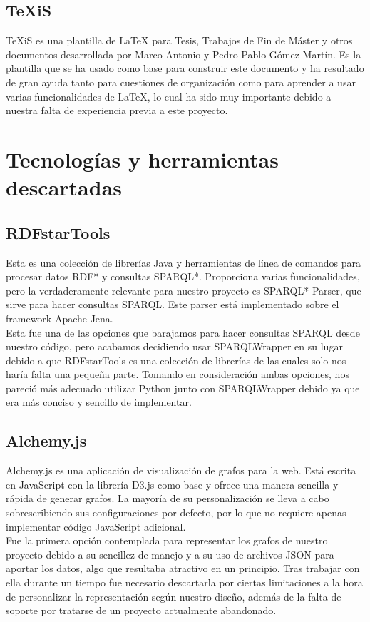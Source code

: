 \subsection*{TeXiS}

TeXiS es una plantilla de LaTeX para Tesis, Trabajos de Fin de Máster y otros documentos desarrollada por Marco Antonio y Pedro Pablo Gómez Martín. Es la plantilla que se ha usado como base para construir este documento y ha resultado de gran ayuda tanto para cuestiones de organización como para aprender a usar varias funcionalidades de LaTeX, lo cual ha sido muy importante debido a nuestra falta de experiencia previa a este proyecto.

\section{Tecnologías y herramientas descartadas}

\subsection*{RDFstarTools}

Esta es una colección de librerías Java y herramientas de línea de comandos para procesar datos RDF* y consultas SPARQL*. Proporciona varias funcionalidades, pero la verdaderamente relevante para nuestro proyecto es SPARQL* Parser, que sirve para hacer consultas SPARQL. Este parser está implementado sobre el framework Apache Jena.\\


Esta fue una de las opciones que barajamos para hacer consultas SPARQL desde nuestro código, pero acabamos decidiendo usar SPARQLWrapper en su lugar debido a que RDFstarTools es una colección de librerías de las cuales solo nos haría falta una pequeña parte. Tomando en consideración ambas opciones, nos pareció más adecuado utilizar Python junto con SPARQLWrapper debido ya que era más conciso y sencillo de implementar.

\subsection*{Alchemy.js}

Alchemy.js es una aplicación de visualización de grafos para la web. Está escrita en JavaScript con la librería D3.js como base y ofrece una manera sencilla y rápida de generar grafos. La mayoría de su personalización se lleva a cabo sobrescribiendo sus configuraciones por defecto, por lo que no requiere apenas implementar código JavaScript adicional.\\

Fue la primera opción contemplada para representar los grafos de nuestro proyecto debido a su sencillez de manejo y a su uso de archivos JSON para aportar los datos, algo que resultaba atractivo en un principio. Tras trabajar con ella durante un tiempo fue necesario descartarla por ciertas limitaciones a la hora de personalizar la representación según nuestro diseño, además de la falta de soporte por tratarse de un proyecto actualmente abandonado.